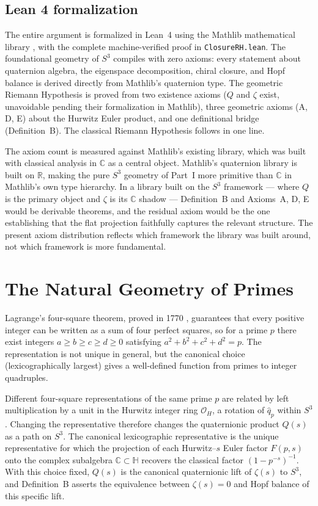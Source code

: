 \documentclass[12pt,a4paper]{article}
\theoremstyle{definition}
\theoremstyle{remark}
\begin{document}
\subsection{Lean 4 formalization}

The entire argument is formalized in Lean~4 using the Mathlib mathematical
library \cite{mathlib2020}, with the complete machine-verified proof in
\texttt{ClosureRH.lean}. The foundational geometry of $S^3$ compiles with
zero axioms: every statement about quaternion algebra, the eigenspace
decomposition, chiral closure, and Hopf balance is derived directly from
Mathlib's quaternion type. The geometric Riemann Hypothesis is proved from
two existence axioms ($Q$ and $\zeta$ exist, unavoidable pending their
formalization in Mathlib), three geometric axioms (A, D, E) about the
Hurwitz Euler product, and one definitional bridge (Definition~B). The
classical Riemann Hypothesis follows in one line.

The axiom count is measured against Mathlib's existing library, which was
built with classical analysis in $\mathbb{C}$ as a central object. Mathlib's
quaternion library is built on $\mathbb{R}$, making the pure $S^3$ geometry
of Part~I more primitive than $\mathbb{C}$ in Mathlib's own type hierarchy.
In a library built on the $S^3$ framework --- where $Q$ is the primary object
and $\zeta$ is its $\mathbb{C}$ shadow --- Definition~B and Axioms~A, D, E
would be derivable theorems, and the residual axiom would be the one
establishing that the flat projection faithfully captures the relevant
structure. The present axiom distribution reflects which framework the library
was built around, not which framework is more fundamental.

\section{The Natural Geometry of Primes}

Lagrange's four-square theorem, proved in 1770 \cite{lagrange1770}, guarantees
that every positive integer can be written as a sum of four perfect squares,
so for a prime $p$ there exist integers $a \geq b \geq c \geq d \geq 0$
satisfying $a^2+b^2+c^2+d^2 = p$. The representation is not unique in
general, but the canonical choice (lexicographically largest) gives a
well-defined function from primes to integer quadruples.

Different four-square representations of the same prime $p$ are related by
left multiplication by a unit in the Hurwitz integer ring $\mathcal{O}_H$,
a rotation of $\hat{q}_p$ within $S^3$. Changing the representative
therefore changes the quaternionic product $Q(s)$ as a path on $S^3$.
The canonical lexicographic representative is the unique representative for
which the projection of each Hurwitz--$s$ Euler factor $F(p,s)$ onto the
complex subalgebra $\mathbb{C} \subset \mathbb{H}$ recovers the classical
factor $(1-p^{-s})^{-1}$.  With this
choice fixed, $Q(s)$ is the canonical quaternionic lift of $\zeta(s)$ to
$S^3$, and Definition~B asserts the equivalence between $\zeta(s) = 0$ and
Hopf balance of this specific lift.
\end{document}

